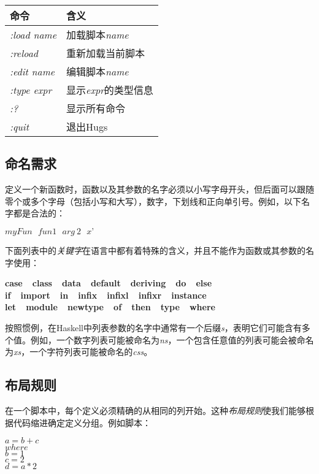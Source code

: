 \begin{table}[htbp]
\label{tab:threesome}
\centering
\begin{tabular}{ll}
\hline
命令 & 含义\\
\hline
\textit{:load name} & 加载脚本\textit{name} \\
\textit{:reload} & 重新加载当前脚本 \\
\textit{:edit name} & 编辑脚本\textit{name} \\
\textit{:type expr} & 显示\textit{expr}的类型信息 \\
\textit{:?} & 显示所有命令 \\
\textit{:quit} & 退出Hugs \\
\hline
\end{tabular}
\end{table}

\subsection{命名需求}
定义一个新函数时，函数以及其参数的名字必须以小写字母开头，但后面可以跟随零个或多个字母（包括小写和大写），数字，下划线和正向单引号。例如，以下名字都是合法的：

\centerline{$myFun~~~fun1~~~arg~2~~~x’$}

下面列表中的\textit{关键字}在语言中都有着特殊的含义，并且不能作为函数或其参数的名字使用：

\begin{center}
\textbf{case~~class~~data~~default~~deriving~~do~~else}\\
\textbf{if~~import~~in~~infix~~infixl~~infixr~~instance}\\
\textbf{let~~module~~newtype~~of~~then~~type~~where}
\end{center}

按照惯例，在Haskell中列表参数的名字中通常有一个后缀\textit{s}，表明它们可能含有多个值。例如，一个数字列表可能被命名为\textit{ns}，一个包含任意值的列表可能会被命名为\textit{xs}，一个字符列表可能被命名的\textit{css}。

\subsection{布局规则}

在一个脚本中，每个定义必须精确的从相同的列开始。这种\textit{布局规则}使我们能够根据代码缩进确定定义分组。例如脚本：

\noindent\hspace*{1cm} $a = b + c$\\
\hspace*{2cm} $        where $\\
\hspace*{3cm} $            b = 1$\\
\hspace*{3cm} $            c = 2$\\
\hspace*{1cm} $d = a * 2$

